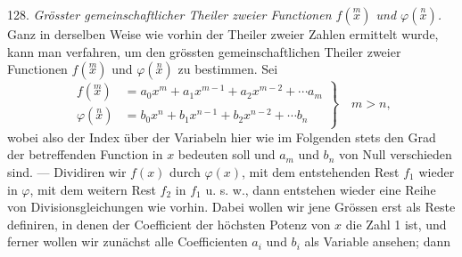 128. \textit{Grösster gemeinschaftlicher Theiler zweier Functionen $f(\overset{m}{x})$ und $\varphi(\overset{n}{x})$.} Ganz in derselben Weise wie vorhin der Theiler zweier Zahlen ermittelt wurde, kann man verfahren, um den grössten gemeinschaftlichen Theiler zweier Functionen $f(\overset{m}{x})$ und $\varphi(\overset{n}{x})$ zu bestimmen.
Sei
\[
\left.\begin{aligned}
f(\overset{m}{x}) &= a_0 x^m + a_1 x^{m-1} + a_2 x^{m-2} + \cdots a_m \\
\varphi(\overset{n}{x}) &= b_0 x^n + b_1 x^{n-1} + b_2 x^{n-2} + \cdots b_n
\end{aligned}\right\} \quad m > n,
\]
wobei also der Index über der Variabeln hier wie im Folgenden stets den Grad der betreffenden Function in $x$ bedeuten soll und $a_m$ und $b_n$ von Null verschieden sind. — Dividiren wir $f(x)$ durch $\varphi(x)$, mit dem entstehenden Rest $f_1$ wieder in $\varphi$, mit dem weitern Rest $f_2$ in $f_1$ u. s. w., dann entstehen wieder eine Reihe von Divisionsgleichungen wie vorhin. Dabei wollen wir jene Grössen erst als Reste definiren, in denen der Coefficient der höchsten Potenz von $x$ die Zahl 1 ist, und ferner wollen wir zunächst alle Coefficienten $a_i$ und $b_i$ als Variable ansehen; dann


